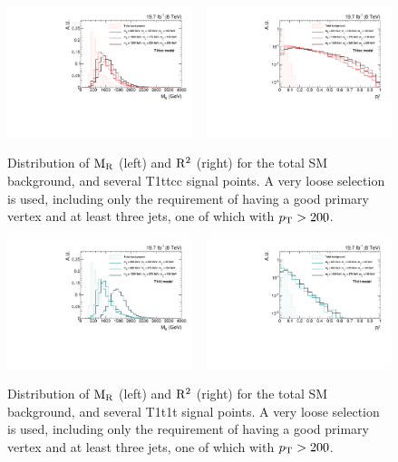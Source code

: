\begin{figure}[htpb]
\centering
\includegraphics[width=0.48\textwidth]{figures/razor_variables/T1ttcc_MR_comparison} 
~
\includegraphics[width=0.48\textwidth]{figures/razor_variables/T1ttcc_R2_comparison}
\caption{Distribution of $\mathrm{M_R}$ (left) and $\mathrm{R^2}$ (right) for the total SM background, and several
T1ttcc signal points. A very loose selection is used, including only the requirement of having a
good primary vertex and at least three jets, one of which with $p_{\mathrm{T}} > 200$\GeV. 
\label{fig:razor_MR_R2_T1ttcc}}
\end{figure}

\begin{figure}[htpb]
\centering
\includegraphics[width=0.48\textwidth]{figures/razor_variables/T1t1t_MR_comparison} 
~
\includegraphics[width=0.48\textwidth]{figures/razor_variables/T1t1t_R2_comparison}
\caption{Distribution of $\mathrm{M_R}$ (left) and $\mathrm{R^2}$ (right) for the total SM background, and several
T1t1t signal points. A very loose selection is used, including only the requirement of having a good
primary vertex and at least three jets, one of which with $p_{\mathrm{T}} > 200$\GeV. 
\label{fig:razor_MR_R2_T1t1t}}
\end{figure}

